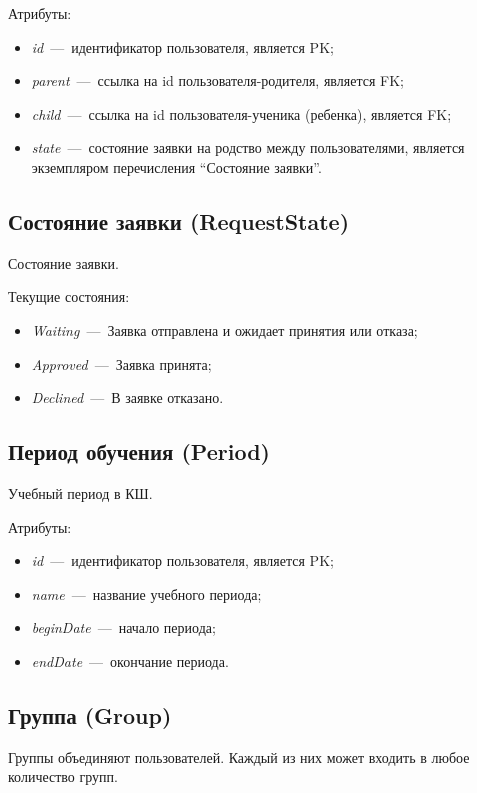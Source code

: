 \documentclass[14pt]{article}
\begin{document}
Атрибуты:
\begin{itemize}
	\item \emph{id}~---~идентификатор пользователя, является PK;
	\item \emph{parent}~---~ссылка на id пользователя-родителя, является FK;
	\item \emph{child}~---~ссылка на id пользователя-ученика (ребенка), является FK;
	\item \emph{state}~---~состояние заявки на родство между пользователями, является экземпляром перечисления ``Состояние заявки''.
\end{itemize}

\subsection{Состояние заявки (RequestState)}

Состояние заявки.

Текущие состояния:
\begin{itemize}
	\item \emph{Waiting}~---~Заявка отправлена и ожидает принятия или отказа;
	\item \emph{Approved}~---~Заявка принята;
	\item \emph{Declined}~---~В заявке отказано.
\end{itemize}

\subsection{Период обучения (Period)}

Учебный период в КШ.

Атрибуты:
\begin{itemize}
	\item \emph{id}~---~идентификатор пользователя, является PK;
	\item \emph{name}~---~название учебного периода;
	\item \emph{beginDate}~---~начало периода;
	\item \emph{endDate}~---~окончание периода.
\end{itemize}

\subsection{Группа (Group)}

Группы объединяют пользователей. Каждый из них может входить в любое количество групп.
\end{document}
